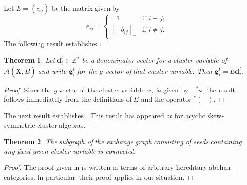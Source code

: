 \documentclass[12pt]{amsart}
\newtheorem{theorem}{Theorem}
\newcommand{\bfd}{\mathbf{d}}
\newcommand{\bfg}{\mathbf{g}}
\newcommand{\bfv}{\mathbf{v}}
\newcommand{\bfX}{\mathbf{X}}
\newcommand{\cA}{\mathcal{A}}
\newcommand{\ZZ}{\mathbb{Z}}
\begin{document}
  Let $E=(e_{ij})$ be the matrix given by
  \[e_{ij}=\begin{cases} -1 & \text{if $i=j$;}\\ [-b_{ij}]_+ & \text{if $i\ne j$.}\end{cases}\]
  The following result establishes \cite[Conj. 3.21]{reading-speyer}.
  \begin{theorem}
    \label{th:d to g}
    Let $\bfd_i^t\in\ZZ^n$ be a denominator vector for a cluster variable of $\cA(\bfX,\tilde B)$ and write $\bfg_i^t$ for the $g$-vector of that cluster variable.  Then $\bfg_i^t=E\bfd_i^t$.
  \end{theorem}
  \begin{proof}
    Since the $g$-vector of the cluster variable $x_\bfv$ is given by $-{}^*\bfv$, the result follows immediately from the definitions of $E$ and the operator ${}^*(-)$.
  \end{proof}

  The next result establishes \cite[Conj. 3.9, 3.10]{reading-speyer}.
  This result has appeared as \cite[Cor. 3]{caldero-keller2} for acyclic skew-symmetric cluster algebras.
  \begin{theorem}
    The subgraph of the exchange graph consisting of seeds containing any fixed given cluster variable is connected.
  \end{theorem}
  \begin{proof}
    The proof given in \cite{caldero-keller2} is written in terms of arbitrary hereditary abelian categories.
    In particular, their proof applies in our situation.
  \end{proof}
\end{document}
